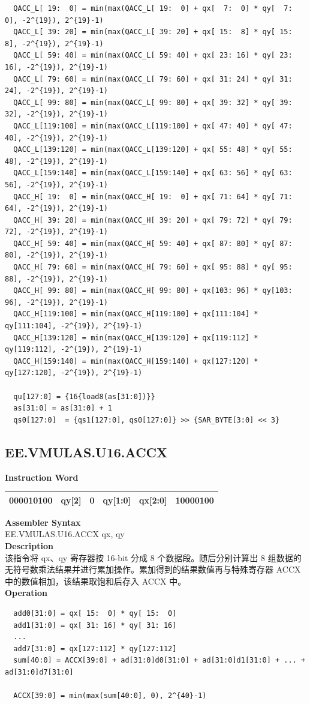 \begin{lstlisting}
  QACC_L[ 19:  0] = min(max(QACC_L[ 19:  0] + qx[  7:  0] * qy[  7:  0], -2^{19}), 2^{19}-1)
  QACC_L[ 39: 20] = min(max(QACC_L[ 39: 20] + qx[ 15:  8] * qy[ 15:  8], -2^{19}), 2^{19}-1)
  QACC_L[ 59: 40] = min(max(QACC_L[ 59: 40] + qx[ 23: 16] * qy[ 23: 16], -2^{19}), 2^{19}-1)
  QACC_L[ 79: 60] = min(max(QACC_L[ 79: 60] + qx[ 31: 24] * qy[ 31: 24], -2^{19}), 2^{19}-1)
  QACC_L[ 99: 80] = min(max(QACC_L[ 99: 80] + qx[ 39: 32] * qy[ 39: 32], -2^{19}), 2^{19}-1)
  QACC_L[119:100] = min(max(QACC_L[119:100] + qx[ 47: 40] * qy[ 47: 40], -2^{19}), 2^{19}-1)
  QACC_L[139:120] = min(max(QACC_L[139:120] + qx[ 55: 48] * qy[ 55: 48], -2^{19}), 2^{19}-1)
  QACC_L[159:140] = min(max(QACC_L[159:140] + qx[ 63: 56] * qy[ 63: 56], -2^{19}), 2^{19}-1)
  QACC_H[ 19:  0] = min(max(QACC_H[ 19:  0] + qx[ 71: 64] * qy[ 71: 64], -2^{19}), 2^{19}-1)
  QACC_H[ 39: 20] = min(max(QACC_H[ 39: 20] + qx[ 79: 72] * qy[ 79: 72], -2^{19}), 2^{19}-1)
  QACC_H[ 59: 40] = min(max(QACC_H[ 59: 40] + qx[ 87: 80] * qy[ 87: 80], -2^{19}), 2^{19}-1)
  QACC_H[ 79: 60] = min(max(QACC_H[ 79: 60] + qx[ 95: 88] * qy[ 95: 88], -2^{19}), 2^{19}-1)
  QACC_H[ 99: 80] = min(max(QACC_H[ 99: 80] + qx[103: 96] * qy[103: 96], -2^{19}), 2^{19}-1)
  QACC_H[119:100] = min(max(QACC_H[119:100] + qx[111:104] * qy[111:104], -2^{19}), 2^{19}-1)
  QACC_H[139:120] = min(max(QACC_H[139:120] + qx[119:112] * qy[119:112], -2^{19}), 2^{19}-1)
  QACC_H[159:140] = min(max(QACC_H[159:140] + qx[127:120] * qy[127:120], -2^{19}), 2^{19}-1)

  qu[127:0] = {16{load8(as[31:0])}}
  as[31:0] = as[31:0] + 1
  qs0[127:0]  = {qs1[127:0], qs0[127:0]} >> {SAR_BYTE[3:0] << 3}
\end{lstlisting}

\clearpage
\subsection{EE.VMULAS.U16.ACCX}\label{instruction:EEVMULASU16ACCX}
\setlength\tabcolsep{6pt}
\textbf{Instruction Word} \\
\begin{tabular}{|c|c|c|c|c|c|}
	\hline
	000010100 & qy[2] & 0 & qy[1:0] & qx[2:0] & 10000100 \\
	\hline
\end{tabular}

\textbf{Assembler Syntax} \\
EE.VMULAS.U16.ACCX qx, qy \\
\textbf{Description} \\
该指令将 qx、qy 寄存器按 16-bit 分成 8 个数据段。随后分别计算出 8 组数据的无符号数乘法结果并进行累加操作。累加得到的结果数值再与特殊寄存器 ACCX 中的数值相加，该结果取饱和后存入 ACCX 中。\\
\textbf{Operation}
\begin{lstlisting}
  add0[31:0] = qx[ 15:  0] * qy[ 15:  0]
  add1[31:0] = qx[ 31: 16] * qy[ 31: 16]
  ...
  add7[31:0] = qx[127:112] * qy[127:112]
  sum[40:0] = ACCX[39:0] + ad[31:0]d0[31:0] + ad[31:0]d1[31:0] + ... + ad[31:0]d7[31:0]

  ACCX[39:0] = min(max(sum[40:0], 0), 2^{40}-1)
\end{lstlisting}

